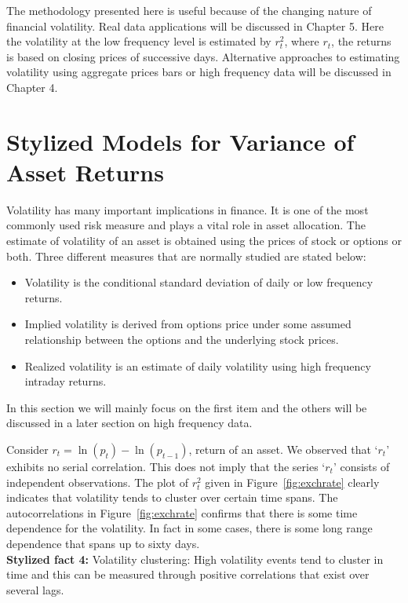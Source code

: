The methodology presented here is useful because of the changing nature of financial volatility. Real data applications will be discussed in Chapter 5. Here the volatility at the low frequency level is estimated by $r_t^2$, where $r_t$, the returns is based on closing prices of successive days. Alternative approaches to estimating volatility using aggregate prices bars or high frequency data will be discussed in Chapter 4. 



\section{Stylized Models for Variance of Asset Returns}


Volatility has many important implications in finance. It is one of the most commonly used risk measure and plays a vital role in asset allocation. The estimate of volatility of an asset is obtained using the prices of stock or options or both. Three different measures that are normally studied are stated below:
\begin{itemize}
\item Volatility is the conditional standard deviation of daily or low frequency returns.

\item Implied volatility is derived from options price under some assumed
relationship between the options and the underlying stock prices.

\item Realized volatility is an estimate of daily volatility using high frequency
intraday returns.
\end{itemize}
In this section we will mainly focus on the first item and the others will be discussed in a later section on high frequency data.


Consider $r_t = \ln{(p_t) - \ln{(p_{t-1})}}$, return of an asset. We observed that `$r_t$' exhibits no serial correlation. This does not imply that the series `$r_t$' consists of independent observations. The plot of $r_t^2$ given in Figure~\ref{fig:exchrate} clearly indicates that volatility tends to cluster over certain time spans. The autocorrelations in Figure~\ref{fig:exchrate} confirms that there is some time dependence for the volatility. In fact in some cases, there is some long range dependence that spans up to sixty days. \\


\noindent\textbf{Stylized fact 4:} Volatility clustering: High volatility events tend to cluster in time and this can be measured through positive correlations that exist over several lags.


